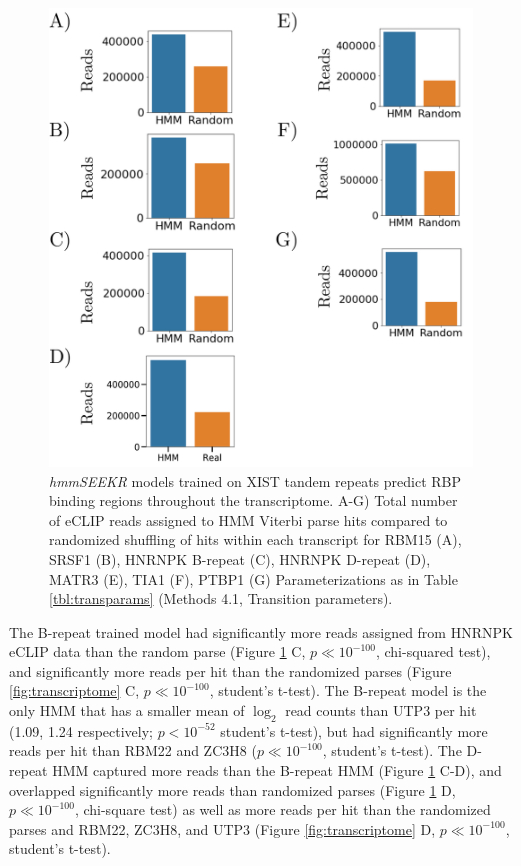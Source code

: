 \begin{figure}[h!]
\centering
\includegraphics[width=.7\textwidth]{images/transcriptomescan.pdf}
\caption[\textit{hmmSEEKR} outperforms random shuffle]{\textit{hmmSEEKR} models trained on XIST tandem repeats predict RBP binding regions throughout the transcriptome. A-G) Total number of eCLIP reads assigned to HMM Viterbi parse hits compared to randomized shuffling of hits within each transcript for RBM15 (A), SRSF1 (B), HNRNPK B-repeat (C), HNRNPK D-repeat (D), MATR3 (E), TIA1 (F), PTBP1 (G) Parameterizations as in Table \ref{tbl:transparams} (Methods 4.1, Transition parameters).}
\label{fig:reads}
\end{figure}

The B-repeat trained model had significantly more reads assigned from HNRNPK eCLIP data than the random parse (Figure \ref{fig:reads} C, $p\ll10^{-100}$, chi-squared test), and significantly more reads per hit than the randomized parses (Figure \ref{fig:transcriptome} C, $p\ll10^{-100}$, student's t-test). The B-repeat model is the only HMM that has a smaller mean of $\log_2$ read counts than UTP3 per hit (1.09, 1.24 respectively; $p<10^{-52}$ student's t-test), but had significantly more reads per hit than RBM22 and ZC3H8 ($p\ll 10^{-100}$, student's t-test). The D-repeat HMM captured more reads than the B-repeat HMM (Figure \ref{fig:reads} C-D), and overlapped significantly more reads than randomized parses (Figure \ref{fig:reads} D, $p\ll10^{-100}$, chi-square test) as well as more reads per hit than the randomized parses and RBM22, ZC3H8, and UTP3 (Figure \ref{fig:transcriptome} D, $p\ll10^{-100}$, student's t-test). 

